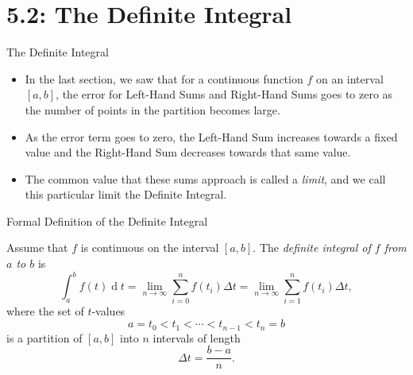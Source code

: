\documentclass[Lecture.tex]{subfiles}
\begin{document}
\section{5.2: The Definite Integral}
\begin{frame}{The Definite Integral}
  \begin{itemize}
  \item<1->
    In the last section, we saw that for a continuous function $f$ on an interval $[a,b]$, the error for Left-Hand Sums and Right-Hand Sums goes to zero as the number of points in the partition becomes large.
  \item<2->
    As the error term goes to zero, the Left-Hand Sum increases towards a fixed value and the Right-Hand Sum decreases towards that same value.
  \item<3->
    The common value that these sums approach is called a {\it limit}, and we call this particular limit the Definite Integral.
  \end{itemize}
\end{frame}

\begin{frame}{Formal Definition of the Definite Integral}
  \begin{defn}
    Assume that $f$ is continuous on the interval $[a,b]$.
    The {\it definite integral of $f$ from $a$ to $b$} is
    $$\int_a^b f(t)\operatorname{d}t = \lim_{n \rightarrow \infty} \sum_{i = 0}^n f(t_i)\Delta t = \lim_{n \rightarrow \infty} \sum_{i = 1}^n f(t_i)\Delta t,$$
    where the set of $t$-values 
    $$a = t_0 < t_1 < \cdots < t_{n-1} < t_n = b$$
    is a partition of $[a,b]$ into $n$ intervals of length
    $$\Delta t = \frac{b - a}{n}.$$
  \end{defn}
\end{frame}
\end{document}
